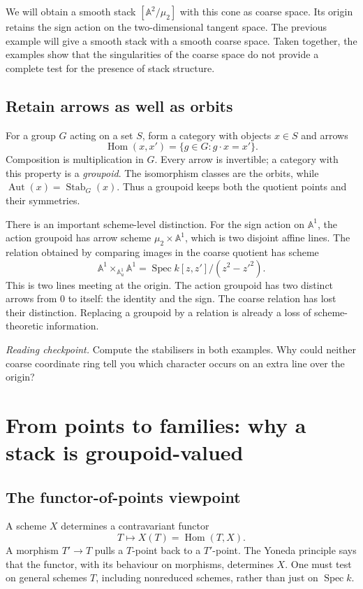 \documentclass[11pt,a4paper]{article}
\numberwithin{equation}{section}
\theoremstyle{definition}
\newcommand{\A}{\mathbb A}
\newcommand{\Spec}{\operatorname{Spec}}
\newcommand{\Hom}{\operatorname{Hom}}
\newcommand{\Aut}{\operatorname{Aut}}
\newcommand{\Stab}{\operatorname{Stab}}
\newcommand{\reading}[1]{\par\smallskip\textit{Reading checkpoint.} #1\par}
\begin{document}
We will obtain a smooth stack $[\A^2/\mu_2]$ with this cone as coarse space.
Its origin retains the sign action on the two-dimensional tangent space. The
previous example will give a smooth stack with a smooth coarse space. Taken
together, the examples show that the singularities of the coarse space do not
provide a complete test for the presence of stack structure.

\subsection{Retain arrows as well as orbits}
For a group $G$ acting on a set $S$, form a category with objects $x\in S$ and
arrows
\[
 \Hom(x,x')=\{g\in G:g\cdot x=x'\}.
\]
Composition is multiplication in $G$. Every arrow is invertible; a category with
this property is a \emph{groupoid}. The isomorphism classes are the orbits, while
$\Aut(x)=\Stab_G(x)$. Thus a groupoid keeps both the quotient points and their
symmetries.

There is an important scheme-level distinction. For the sign action on $\A^1$,
the action groupoid has arrow scheme $\mu_2\times\A^1$, which is two disjoint
affine lines. The relation obtained by comparing images in the coarse quotient
has scheme
\[
 \A^1\times_{\A^1_u}\A^1
 =\Spec k[z,z']/(z^2-z'^2).
\]
This is two lines meeting at the origin. The action groupoid has two distinct
arrows from $0$ to itself: the identity and the sign. The coarse relation has
lost their distinction. Replacing a groupoid by a relation is already a loss of
scheme-theoretic information.

\reading{Compute the stabilisers in both examples. Why could neither coarse
coordinate ring tell you which character occurs on an extra line over the origin?}

\section{From points to families: why a stack is groupoid-valued}
\label{sec:families}

\subsection{The functor-of-points viewpoint}
A scheme $X$ determines a contravariant functor
\[
 T\longmapsto X(T)=\Hom(T,X).
\]
A morphism $T'\to T$ pulls a $T$-point back to a $T'$-point. The Yoneda principle
says that the functor, with its behaviour on morphisms, determines $X$. One must
test on general schemes $T$, including nonreduced schemes, rather than just on
$\Spec k$.
\end{document}
